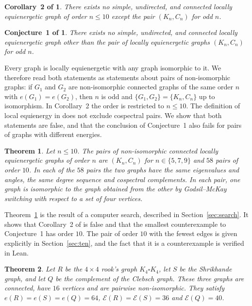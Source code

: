 \documentclass[11pt]{amsart}
\newtheorem{theorem}{Theorem}[section]
\newtheorem*{dpcor}{Corollary~2 of \cite{DP}}
\newtheorem*{dpconj}{Conjecture~1 of \cite{DP}}
\theoremstyle{remark}
\newcommand{\cE}{\mathcal{E}}
\begin{document}
\begin{dpcor}
There exists no simple, undirected, and connected locally equienergetic graph of order $n\le10$ except the pair $(K_n,C_n)$ for odd $n$.
\end{dpcor}

\begin{dpconj}
There exists no simple, undirected, and connected locally equienergetic graph other than the pair of locally equienergetic graphs $(K_n,C_n)$ for odd $n$.
\end{dpconj}

Every graph is locally equienergetic with any graph isomorphic to it.
We therefore read both statements as statements about pairs of non-isomorphic graphs: if $G_1$ and $G_2$ are non-isomorphic connected graphs of the same order $n$ with $e(G_1)=e(G_2)$, then $n$ is odd and $\{G_1,G_2\}=\{K_n,C_n\}$ up to isomorphism.
In Corollary~2 the order is restricted to $n\le10$.
The definition of local equienergy in \cite{DP} does not exclude cospectral pairs.
We show that both statements are false, and that the conclusion of Conjecture~1 also fails for pairs of graphs with different energies.

\begin{theorem}\label{thm:10}
Let $n\le10$.
The pairs of non-isomorphic connected locally equienergetic graphs of order $n$ are $(K_n,C_n)$ for $n\in\{5,7,9\}$ and $58$ pairs of order $10$.
In each of the $58$ pairs the two graphs have the same eigenvalues and angles, the same degree sequence and cospectral complements.
In each pair, one graph is isomorphic to the graph obtained from the other by Godsil--McKay switching with respect to a set of four vertices.
\end{theorem}

Theorem~\ref{thm:10} is the result of a computer search, described in Section~\ref{sec:search}.
It shows that Corollary~2 of \cite{DP} is false and that the smallest counterexample to Conjecture~1 has order $10$.
The pair of order $10$ with the fewest edges is given explicitly in Section~\ref{sec:ten}, and the fact that it is a counterexample is verified in Lean.

\begin{theorem}\label{thm:16}
Let $R$ be the $4\times4$ rook's graph $K_4\square K_4$, let $S$ be the Shrikhande graph, and let $Q$ be the complement of the Clebsch graph.
These three graphs are connected, have $16$ vertices and are pairwise non-isomorphic.
They satisfy $e(R)=e(S)=e(Q)=64$, $\cE(R)=\cE(S)=36$ and $\cE(Q)=40$.
\end{theorem}
\end{document}
